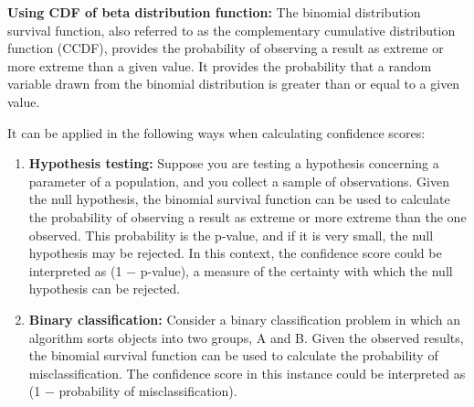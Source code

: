 \textbf{Using CDF of beta distribution function:}
The binomial distribution survival function, also referred to as the complementary cumulative distribution function (CCDF), provides the probability of observing a result as extreme or more extreme than a given value. It provides the probability that a random variable drawn from the binomial distribution is greater than or equal to a given value.

It can be applied in the following ways when calculating confidence scores:

\begin{enumerate}
    \item \textbf{Hypothesis testing:}
    Suppose you are testing a hypothesis concerning a parameter of a population, and you collect a sample of observations. Given the null hypothesis, the binomial survival function can be used to calculate the probability of observing a result as extreme or more extreme than the one observed. This probability is the p-value, and if it is very small, the null hypothesis may be rejected. In this context, the confidence score could be interpreted as (1 $-$ p-value), a measure of the certainty with which the null hypothesis can be rejected.

    \item \textbf{Binary classification:} Consider a binary classification problem in which an algorithm sorts objects into two groups, A and B. Given the observed results, the binomial survival function can be used to calculate the probability of misclassification. The confidence score in this instance could be interpreted as (1 $-$ probability of misclassification).
\end{enumerate}

